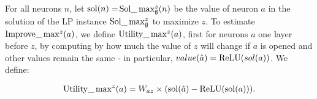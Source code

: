 \iffalse
\begin{align*}
	|(I_X - \sum_{b\in X} I_b)/I_X| < 1\%. \ (\text{in experiments})
\end{align*} Even $X$ contains neurons from 3 layers before the target layer, in experiments, $I_X$ is still close to $\sum_{b\in X} I_b$.

Therefore, based on this observation, the question to choose $X$ is converted to compute $I_b$ for neurons $b$ in layers before the target layer. Our formula is to estimate the improvement of different individual neurons in different layers. For different layers, the formula will be different.  However, neither the observation in this subsection nor the formula in the next subsection has solid theoretical proof to show that they are very accurate. They are all based on experiments. 


In our algorithm, we will open neurons at most 3 layer3 before the target layer. So the formula will consists of three parts.


\subsubsection*{Compute the improvement of a single neuron}

\subsection*{One Layer before $z$}

\fi

For all neurons $n$, let $\mathrm{sol}(n)=$$\mathrm{Sol}\_\max_\emptyset^z(n)$ be the value of neuron $a$
in the solution of the LP instance $\mathrm{Sol}\_\max_\emptyset^z$ to maximize $z$.
To estimate $\mathrm{Improve}\_\max^z(a)$, we define $\mathrm{Utility}\_\max^z(a)$, first for neurons $a$ one layer before $z$, by computing by how much the value of $z$ will change if $a$ is opened
and other values remain the same - in particular, $value(\hat{a})=\mathrm{ReLU}(sol(a))$. We define:

	\begin{align}
		\mathrm{Utility}\_\max\nolimits^z(a) = W_{az} \times (\mathrm{sol}(\hat{a})- \mathrm{ReLU}(\mathrm{sol}(a))).
	\end{align}
	

